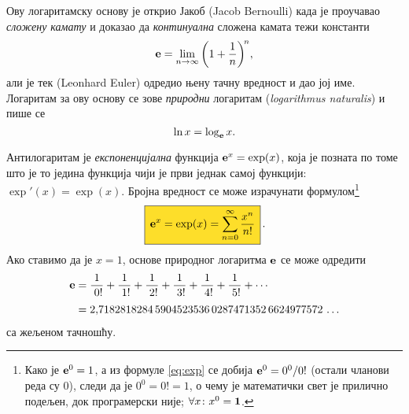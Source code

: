 Ову логаритамску основу је открио Јакоб  (Jacob Bernoulli) када је
проучавао {\sl сложену камату\/} и доказао да {\sl континуална\/} сложена камата
тежи константи
\begin{equation}\label{eq:elim}
\e=\lim_{n\to\infty}\left(1+\frac1n\right)^{\!n}\!,\index{лимес}
\end{equation}
али је тек  (Leonhard Euler)
одредио њену тачну вредност и дао јој име.
Логаритам за ову основу се зове
{\sl природни\/} логаритам ({\sl logarithmus naturalis\/})
и пише се
$$
\ln x=\log_{\bf e} x.
$$

\def\ep{\hphantom{!}}%
\def\rf#1!{\frac1{\hphantom{!}#1!}}%
Антилогаритам је {\sl експоненцијална\/} функција ${\bf e}^x=\exp(x)$, 
која је позната по томе што је то
једина функција чији је први
 једнак самој функцији: $\exp'(x)=\exp(x)$. 
Бројна вредност се може израчунати формулом\footnote{Како је ${\bf e}^0=1$, а из формуле \eqref{eq:exp} се добија
${\bf e}^0=0^0/0!$ (остали чланови реда су 0), следи да је $0^0=0!=1$, 
о чему је математички свет је прилично подељен, док програмерски није; $\forall x\colon x^0={\bf1}$.}
\begin{equation}
\label{eq:exp}\index{формула}
\okvir{\e^x=\exp(x)=\sum_{n=0}^\infty\frac{x^n}{n!}}.
\end{equation}%
Ако ставимо да је $x=1$,
 основе природног логаритма ${\bf e}$ се може одредити
\begin{equation}\label{eq:e}
\begin{split}
\e
&=\rf0!+\rf1!+\rf2!+\rf3!+\rf4!+\rf5!+\cdots\\
\noalign{\smallskip}
&=2\.
7182818284\,
5904523536\,
0287471352\,
6624977572\,\ldots
\end{split}
\end{equation}
са жељеном тачношћу.
